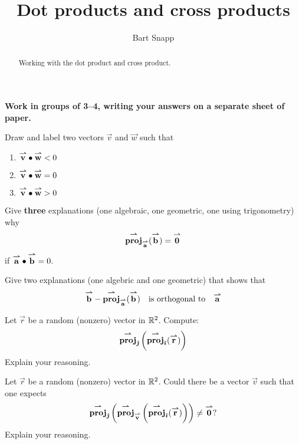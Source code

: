 \documentclass[handout,nooutcomes,noauthor]{ximera}
\author{Bart Snapp}
\title[Collaborate:]{Dot products and cross products}
\begin{document}
\begin{abstract}
  Working with the dot product and cross product. 
\end{abstract}
\maketitle

\textbf{Work in groups of 3--4, writing your answers on a separate
  sheet of paper.}

\begin{problem}
  Draw and label two vectors $\vec{v}$ and $\vec{w}$ such that
  \begin{enumerate}
  \item $\vec{v}\dotp\vec{w} <0$
  \item $\vec{v}\dotp\vec{w} =0$
  \item $\vec{v}\dotp\vec{w} >0$
  \end{enumerate}
\end{problem}

\begin{problem}
  Give \textbf{three} explanations (one algebraic, one geometric, one
  using trigonometry) why
  \[
  \proj_{\vec{a}}(\vec{b}) = \vec{0}
  \]
  if $\vec{a}\dotp\vec{b} = 0$.
\end{problem}

\begin{problem}
  Give two explanations (one algebric and one geometric) that shows
  that
  \[
  \vec{b} - \proj_{\vec{a}}(\vec{b}) \quad\text{is orthogonal to}\quad \vec{a}
  \]
\end{problem}


\begin{problem}
  Let $\vec{r}$ be a random (nonzero) vector in $\R^2$. Compute:
  \[
  \proj_\vecj\left(\proj_\veci(\vec{r})\right)
  \]
  Explain your reasoning.
\end{problem}

\begin{problem}
  Let $\vec{r}$ be a random (nonzero) vector in $\R^2$. Could there be
  a vector $\vec{v}$ such that one expects
  \[
  \proj_\vecj\left(\proj_{\vec{v}}\left(\proj_\veci(\vec{r})\right)\right)\ne \vec{0}?
  \]
  Explain your reasoning.
\end{problem}
\end{document}
